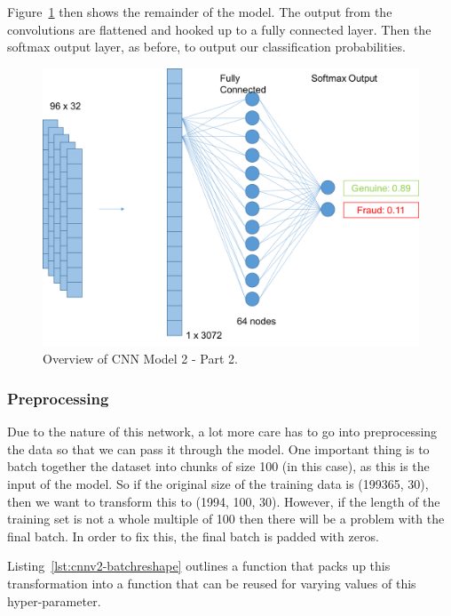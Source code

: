 \documentclass[12pt,a4paper,twoside]{report}
\begin{document}
Figure~\ref{fig:cnnv2-2} then shows the remainder of the model. The output from the convolutions are flattened and hooked up to a fully connected layer. Then the softmax output layer, as before, to output our classification probabilities. 

\begin{figure}[H]
\centering
\includegraphics[scale=0.6]{cnnv2-2}
\caption{Overview of CNN Model 2 - Part 2.}
\label{fig:cnnv2-2}
\end{figure}

\subsubsection{Preprocessing}

Due to the nature of this network, a lot more care has to go into preprocessing the data so that we can pass it through the model. One important thing is to batch together the dataset into chunks of size 100 (in this case), as this is the input of the model. So if the original size of the training data is (199365, 30), then we want to transform this to (1994, 100, 30). However, if the length of the training set is not a whole multiple of 100 then there will be a problem with the final batch. In order to fix this, the final batch is padded with zeros. 

Listing~\ref{lst:cnnv2-batchreshape} outlines a function that packs up this transformation into a function that can be reused for varying values of this hyper-parameter.

\end{document}
